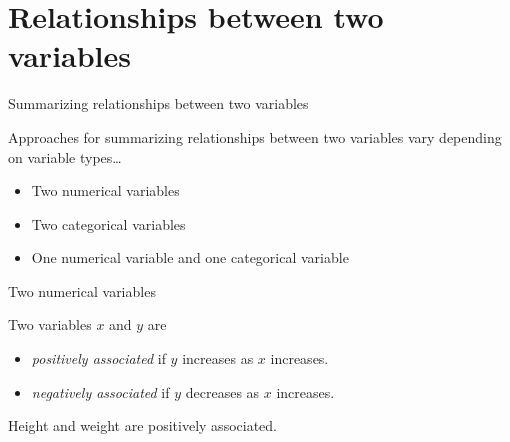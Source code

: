 \documentclass[10pt]{beamer}\usepackage[]{graphicx}\usepackage[]{color}
\begin{document}
	
	
	\hypertarget{relationships-between-two-variables}{%
	\section{Relationships between two variables}\label{relationships-between-two-variables}}
						
\begin{frame}{Summarizing relationships between two variables}
							\protect\hypertarget{summarizing-relationships-between-two-variables}{}
							
							Approaches for summarizing relationships between two variables vary
							depending on variable types\ldots{}
							
							\begin{itemize}
								\item
								Two numerical variables
								\item
								Two categorical variables
								\item
								One numerical variable and one categorical variable
							\end{itemize}
							
\end{frame}
						
						\begin{frame}{Two numerical variables}
							\protect\hypertarget{two-numerical-variables}{}
							
							Two variables \(x\) and \(y\) are
							
							\begin{itemize}
								\item
								\emph{positively associated} if \(y\) increases as \(x\) increases.
								\item
								\emph{negatively associated} if \(y\) decreases as \(x\) increases.
							\end{itemize}
							
							Height and weight are positively associated.
							
						\end{frame}
						
\end{document}
